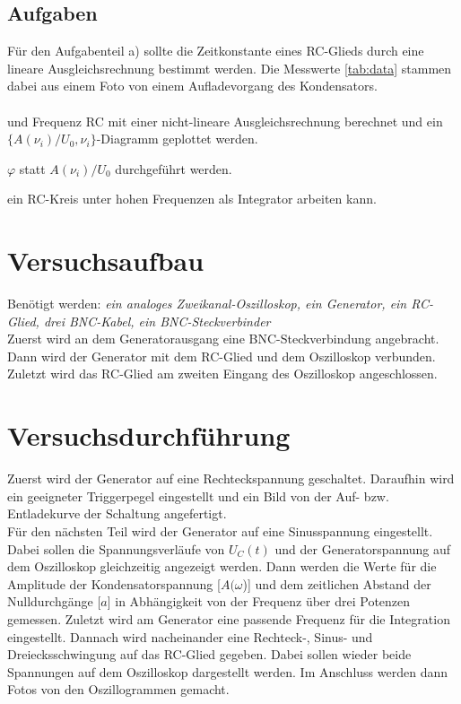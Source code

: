 \subsection{Aufgaben}
  Für den Aufgabenteil a) sollte die Zeitkonstante eines RC-Glieds durch 
  eine lineare Ausgleichsrechnung bestimmt werden. Die Messwerte \ref{tab:data} 
  stammen dabei aus einem Foto von einem Aufladevorgang des Kondensators.\\

  \\ und
  Frequenz RC mit einer nicht-lineare Ausgleichsrechnung berechnet und ein 
  $\{ A(\nu _i)/U_0,\nu _i \}$-Diagramm geplottet werden.

  $\varphi$ statt $A(\nu _i)/U_0$ durchgeführt werden.

  ein RC-Kreis unter hohen Frequenzen als Integrator arbeiten kann.

  



\section{Versuchsaufbau}
Benötigt werden: \textit{ein analoges Zweikanal-Oszilloskop, ein Generator, ein RC-Glied, drei BNC-Kabel, ein BNC-Steckverbinder }\\
Zuerst wird an dem Generatorausgang eine BNC-Steckverbindung angebracht. 
Dann wird der Generator mit dem RC-Glied und dem Oszilloskop verbunden. \\
Zuletzt wird das RC-Glied am zweiten Eingang des Oszilloskop angeschlossen.
\section{Versuchsdurchführung}
Zuerst wird der Generator auf eine Rechteckspannung geschaltet. Daraufhin wird
ein geeigneter Triggerpegel eingestellt und ein Bild von der Auf- bzw. Entladekurve
der Schaltung angefertigt.\\
Für den nächsten Teil wird der Generator auf eine Sinusspannung eingestellt.
Dabei sollen die Spannungsverläufe von $U_C(t)$ und der Generatorspannung auf dem
Oszilloskop gleichzeitig angezeigt werden. Dann werden die Werte für die Amplitude 
der Kondensatorspannung [$A(\omega$)] und dem zeitlichen Abstand der Nulldurchgänge 
[$a$] in Abhängigkeit von der Frequenz über drei Potenzen gemessen.
Zuletzt wird am Generator eine passende Frequenz für die Integration eingestellt.
Dannach wird nacheinander eine Rechteck-, Sinus- und Dreiecksschwingung auf das
RC-Glied gegeben. Dabei sollen wieder beide Spannungen auf dem Oszilloskop 
dargestellt werden. Im Anschluss werden dann Fotos von den Oszillogrammen gemacht.

